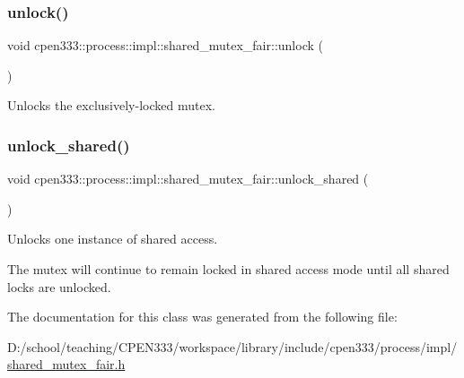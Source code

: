 \subsubsection{\texorpdfstring{unlock()}{unlock()}}
{\footnotesize\ttfamily void cpen333\+::process\+::impl\+::shared\+\_\+mutex\+\_\+fair\+::unlock (\begin{DoxyParamCaption}{ }\end{DoxyParamCaption})\hspace{0.3cm}{\ttfamily [inline]}}



Unlocks the exclusively-\/locked mutex. 

\mbox{\label{classcpen333_1_1process_1_1impl_1_1shared__mutex__fair_afa970da78252148b1ff049be3c239155}} 
\subsubsection{\texorpdfstring{unlock\+\_\+shared()}{unlock\_shared()}}
{\footnotesize\ttfamily void cpen333\+::process\+::impl\+::shared\+\_\+mutex\+\_\+fair\+::unlock\+\_\+shared (\begin{DoxyParamCaption}{ }\end{DoxyParamCaption})\hspace{0.3cm}{\ttfamily [inline]}}



Unlocks one instance of shared access. 

The mutex will continue to remain locked in shared access mode until all shared locks are unlocked. 

The documentation for this class was generated from the following file\+:\begin{DoxyCompactItemize}
\item 
D\+:/school/teaching/\+C\+P\+E\+N333/workspace/library/include/cpen333/process/impl/\hyperlink{process_2impl_2shared__mutex__fair_8h}{shared\+\_\+mutex\+\_\+fair.\+h}\end{DoxyCompactItemize}
